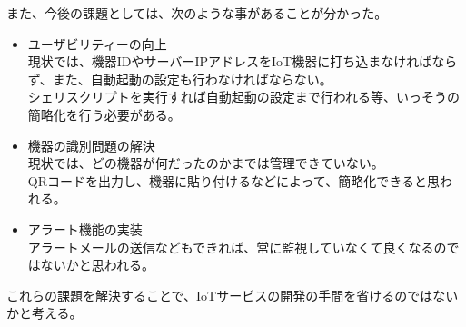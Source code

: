 また、今後の課題としては、次のような事があることが分かった。
\begin{itemize}
	\item ユーザビリティーの向上\\
		現状では、機器IDやサーバーIPアドレスをIoT機器に打ち込まなければならず、また、自動起動の設定も行わなければならない。\\
		シェリスクリプトを実行すれば自動起動の設定まで行われる等、いっそうの簡略化を行う必要がある。
	\item 機器の識別問題の解決\\
		現状では、どの機器が何だったのかまでは管理できていない。\\
		QRコードを出力し、機器に貼り付けるなどによって、簡略化できると思われる。
	\item アラート機能の実装\\
		アラートメールの送信などもできれば、常に監視していなくて良くなるのではないかと思われる。
\end{itemize}
これらの課題を解決することで、IoTサービスの開発の手間を省けるのではないかと考える。


